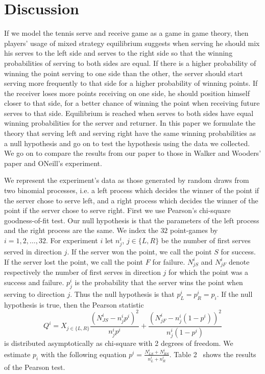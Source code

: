 \documentclass[11pt]{article}
\begin{document}
\section{Discussion}
If we model the tennis serve and receive game as a game in game theory, then players’ usage of mixed strategy equilibrium suggests when serving he should mix his serves to the left side and serves to the right side so that the winning probabilities of serving to both sides are equal. If there is a higher probability of winning the point serving to one side than the other, the server should start serving more frequently to that side for a higher probability of winning points. If the receiver loses more points receiving on one side, he should position himself closer to that side, for a better chance of winning the point when receiving future serves to that side. Equilibrium is reached when serves to both sides have equal winning probabilities for the server and returner. In this paper we formulate the theory that serving left and serving right have the same winning probabilities as a null hypothesis and go on to test the hypothesis using the data we collected. We go on to compare the results from our paper to those in Walker and Wooders’ paper and ONeill’s experiment.

We represent the experiment’s data as those generated by random draws from two binomial processes, i.e. a left process which decides the winner of the point if the server chose to serve left, and a right process which decides the winner of the point if the server chose to serve right. First we use Pearson’s chi-square goodness-of-fit test. Our null hypothesis is that the parameters of the left process and the right process are the same. We index the $32$ point-games by $i=1,2,\dots,32$. For experiment $i$ let $n^i_j$, $j \in \{L,R\}$ be the number of first serves served in direction $j$. If the server won the point, we call the point $S$ for success. If the server lost the point, we call the point $F$ for failure. $N^i_{jS}$ and $N^i_{jF}$ denote respectively the number of first serves in direction $j$ for which the point was a success and failure. $p^i_j$ is the probability that the server wins the point when serving to direction $j$. Thus the null hypothesis is that $p^i_L=p^i_R=p_i$. If the null hypothesis is true, then the Pearson statistic 
\[
Q^i = X_{j\in \{L,R\}} \frac{(N^i_{JS} - n^i_j p^i)^2}{n^i_jp^i} + \frac{(N^i_{jF} - n^i_j (1-p^i))^2}{n^i_j(1-p^i)}
\]
is distributed asymptotically as chi-square with 2 degrees of freedom. We estimate $p_i$ with the following equation $p^i = \frac{N^i_{LS} + N^i_{RS}}{n^i_L + n^i_R}$. Table 2~ shows the results of the Pearson test. 
\end{document}
